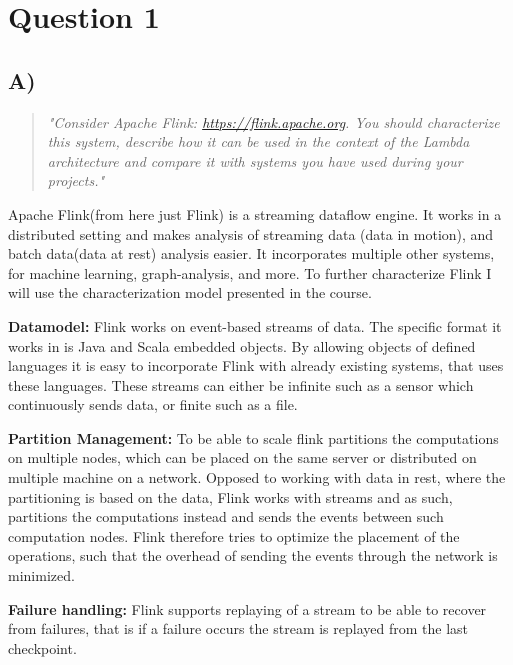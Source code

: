 \section{Question 1}

\subsection{A)}
\begin{quote}
	\textit{"Consider	Apache	Flink: \url{https://flink.apache.org}.	You	should	characterize	this	system,	describe	how	it	can	be	used	in	the	context	of	the	Lambda	architecture	and	compare	it	with	systems	you	have	used	during	your	projects."}
\end{quote}

\newpar Apache Flink(from here just Flink) is a streaming dataflow engine. It works in a distributed setting and makes analysis of streaming data (data in motion), and batch data(data at rest) analysis easier. It incorporates multiple other systems, for machine learning, graph-analysis, and more. To further characterize Flink I will use the characterization model presented in the course.

\newpar \textbf{Datamodel:} Flink works on event-based streams of data. The specific format it works in is Java and Scala embedded objects. By allowing objects of defined languages it is easy to incorporate Flink with already existing systems, that uses these languages. These streams can either be infinite such as a sensor which continuously sends data, or finite such as a file.

\newpar \textbf{Partition Management:} To be able to scale flink partitions the computations on multiple nodes, which can be placed on the same server or distributed on multiple machine on a network. Opposed to working with data in rest, where the partitioning is based on the data, Flink works with streams and as such, partitions the computations instead and sends the events between such computation nodes. Flink therefore tries to optimize the placement of the operations, such that the overhead of sending the events through the network is minimized\cite{official-flink}.

\newpar \textbf{Failure handling:} Flink supports replaying of a stream to be able to recover from failures, that is if a failure occurs the stream is replayed from the last checkpoint.

